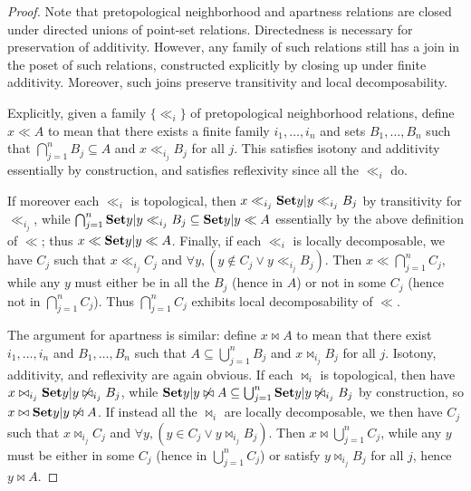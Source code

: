 \documentclass{article}
\def\cpl#1{\neg #1}
\def\nn{\ensuremath{\neg\neg}}
\begin{document}
\begin{proof}
  Note that pretopological neighborhood and apartness relations are closed under directed unions of point-set relations.
  Directedness is necessary for preservation of additivity.
  However, any family of such relations still has a join in the poset of such relations, constructed explicitly by closing up under finite additivity.
  Moreover, such joins preserve transitivity %
  and local decomposability.

  Explicitly, given a family $\{\ll_i\}$ of pretopological neighborhood relations, define $x\ll A$ to mean that there exists a finite family $i_1,\dots,i_n$ and sets $B_1,\dots, B_n$ such that $\bigcap_{j=1}^n B_j \subseteq A$ and $x\ll_{i_j} B_j$ for all $j$.
  This satisfies isotony and additivity essentially by construction, and satisfies reflexivity since all the $\ll_i$ do.

  If moreover each $\ll_i$ is topological, then $x\ll_{i_j} \setof{y|y\ll_{i_j} B_j}$ by transitivity for $\ll_{i_j}$, while $\bigcap_{j=1}^n \setof{y|y\ll_{i_j} B_j} \subseteq \setof{y|y\ll A}$ essentially by the above definition of $\ll$; thus $x\ll \setof{y|y\ll A}$.
  Finally, if each $\ll_i$ is locally decomposable, we have $C_j$ such that $x\ll_{i_j} C_j$ and $\forall y, (y\notin C_j \lor y\ll_{i_j} B_j)$.
  Then $x \ll \bigcap_{j=1}^n C_j$, while any $y$ must either be in all the $B_j$ (hence in $A$) or not in some $C_j$ (hence not in $\bigcap_{j=1}^n C_j$).
  Thus $\bigcap_{j=1}^n C_j$ exhibits local decomposability of $\ll$.

  The argument for apartness is similar: define $x\bowtie A$ to mean that there exist $i_1,\dots,i_n$ and $B_1,\dots, B_n$ such that $A\subseteq \bigcup_{j=1}^n B_j$ and $x\bowtie_{i_j} B_j$ for all $j$.
  Isotony, additivity, and reflexivity are again obvious.
  If each $\bowtie_i$ is topological, then have $x\bowtie_{i_j} \setof{y|y\not\bowtie_{i_j} B_j}$, while $\setof{y|y\not\bowtie A} \subseteq \bigcup_{j=1}^n\setof{y|y\not\bowtie_{i_j} B_j}$ by construction, so $x\bowtie \setof{y|y\not\bowtie A}$.
  If instead all the $\bowtie_i$ are locally decomposable, we then have $C_j$ such that $x\bowtie_{i_j} C_j$ and $\forall y, (y\in C_j \lor y\bowtie_{i_j} B_j)$.
  Then $x\bowtie \bigcup_{j=1}^n C_j$, while any $y$ must be either in some $C_j$ (hence in $\bigcup_{j=1}^n C_j$) or satisfy $y\bowtie_{i_j} B_j$ for all $j$, hence $y\bowtie A$.


\end{proof}
\end{document}
